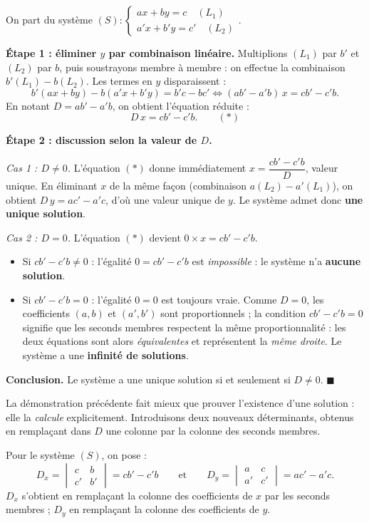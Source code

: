 \documentclass[11pt]{article}
\newcounter{popsec}
\newcounter{popsub}
\newcommand{\courssub}[1]{%
  \stepcounter{popsub}%
  \par\vspace{9pt}\noindent{\popxbold\fontsize{11.5}{13}\selectfont\color{popink}{\color{poporange}\thepopsec.\thepopsub}\hspace{6pt}#1}\par\nopagebreak\vspace{4pt}
}
\def\star{\mathbin{\ast}}\def\bigstar{\mathord{\ast}}%
\begin{document}
\begin{experience}
On part du système $(S) : \begin{cases} ax + by = c \quad (L_1)\\ a'x + b'y = c' \quad (L_2) \end{cases}$.

\textbf{Étape 1 : éliminer $y$ par combinaison linéaire.} Multiplions $(L_1)$ par $b'$ et $(L_2)$ par $b$, puis soustrayons membre à membre : on effectue la combinaison $b'(L_1)-b(L_2)$. Les termes en $y$ disparaissent :
\[
b'(ax+by) - b(a'x+b'y) = b'c - bc' \iff (ab'-a'b)\,x = cb'-c'b.
\]
En notant $D=ab'-a'b$, on obtient l'équation \og réduite \fg{} :
\[
D\,x = cb'-c'b. \qquad (\star)
\]

\textbf{Étape 2 : discussion selon la valeur de $D$.}

\emph{Cas 1 : $D\neq 0$.} L'équation $(\star)$ donne immédiatement $x=\dfrac{cb'-c'b}{D}$, valeur unique. En éliminant $x$ de la même façon (combinaison $a(L_2)-a'(L_1)$), on obtient $D\,y = ac'-a'c$, d'où une valeur unique de $y$. Le système admet donc \textbf{une unique solution}.

\emph{Cas 2 : $D=0$.} L'équation $(\star)$ devient $0\times x = cb'-c'b$.
\begin{itemize}
\item Si $cb'-c'b\neq 0$ : l'égalité $0 = cb'-c'b$ est \emph{impossible} : le système n'a \textbf{aucune solution}.
\item Si $cb'-c'b=0$ : l'égalité $0=0$ est toujours vraie. Comme $D=0$, les coefficients $(a,b)$ et $(a',b')$ sont proportionnels ; la condition $cb'-c'b=0$ signifie que les seconds membres respectent la même proportionnalité : les deux équations sont alors \emph{équivalentes} et représentent la \emph{même droite}. Le système a une \textbf{infinité de solutions}.
\end{itemize}

\textbf{Conclusion.} Le système a une unique solution si et seulement si $D\neq 0$. $\blacksquare$
\end{experience}

\courssub{Les formules de Cramer}

La démonstration précédente fait mieux que prouver l'existence d'une solution : elle la \emph{calcule} explicitement. Introduisons deux nouveaux déterminants, obtenus en remplaçant dans $D$ une colonne par la colonne des seconds membres.

\begin{definition}[Déterminants $D_x$ et $D_y$]
Pour le système $(S)$, on pose :
\[
D_x = \begin{vmatrix} c & b \\ c' & b' \end{vmatrix} = cb'-c'b
\qquad\text{et}\qquad
D_y = \begin{vmatrix} a & c \\ a' & c' \end{vmatrix} = ac'-a'c.
\]
$D_x$ s'obtient en remplaçant la colonne des coefficients de $x$ par les seconds membres ; $D_y$ en remplaçant la colonne des coefficients de $y$.
\end{definition}
\end{document}
